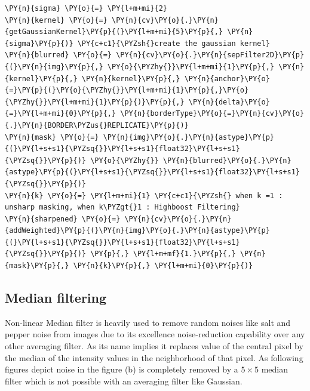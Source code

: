 \documentclass[a4paper,10pt]{article}%
\begin{document}
    \begin{tcolorbox}[breakable, size=fbox, boxrule=1pt, pad at break*=1mm,colback=cellbackground, colframe=cellborder]
\begin{Verbatim}[commandchars=\\\{\}]
\PY{n}{sigma} \PY{o}{=} \PY{l+m+mi}{2} 
\PY{n}{kernel} \PY{o}{=} \PY{n}{cv}\PY{o}{.}\PY{n}{getGaussianKernel}\PY{p}{(}\PY{l+m+mi}{5}\PY{p}{,} \PY{n}{sigma}\PY{p}{)} \PY{c+c1}{\PYZsh{}create the gaussian kernel}
\PY{n}{blurred} \PY{o}{=} \PY{n}{cv}\PY{o}{.}\PY{n}{sepFilter2D}\PY{p}{(}\PY{n}{img}\PY{p}{,} \PY{o}{\PYZhy{}}\PY{l+m+mi}{1}\PY{p}{,} \PY{n}{kernel}\PY{p}{,} \PY{n}{kernel}\PY{p}{,} \PY{n}{anchor}\PY{o}{=}\PY{p}{(}\PY{o}{\PYZhy{}}\PY{l+m+mi}{1}\PY{p}{,}\PY{o}{\PYZhy{}}\PY{l+m+mi}{1}\PY{p}{)}\PY{p}{,} \PY{n}{delta}\PY{o}{=}\PY{l+m+mi}{0}\PY{p}{,} \PY{n}{borderType}\PY{o}{=}\PY{n}{cv}\PY{o}{.}\PY{n}{BORDER\PYZus{}REPLICATE}\PY{p}{)}
\PY{n}{mask} \PY{o}{=} \PY{n}{img}\PY{o}{.}\PY{n}{astype}\PY{p}{(}\PY{l+s+s1}{\PYZsq{}}\PY{l+s+s1}{float32}\PY{l+s+s1}{\PYZsq{}}\PY{p}{)} \PY{o}{\PYZhy{}} \PY{n}{blurred}\PY{o}{.}\PY{n}{astype}\PY{p}{(}\PY{l+s+s1}{\PYZsq{}}\PY{l+s+s1}{float32}\PY{l+s+s1}{\PYZsq{}}\PY{p}{)}
\PY{n}{k} \PY{o}{=} \PY{l+m+mi}{1} \PY{c+c1}{\PYZsh{} when k =1 : unsharp masking, when k\PYZgt{}1 : Highboost Filtering}
\PY{n}{sharpened} \PY{o}{=} \PY{n}{cv}\PY{o}{.}\PY{n}{addWeighted}\PY{p}{(}\PY{n}{img}\PY{o}{.}\PY{n}{astype}\PY{p}{(}\PY{l+s+s1}{\PYZsq{}}\PY{l+s+s1}{float32}\PY{l+s+s1}{\PYZsq{}}\PY{p}{)} \PY{p}{,} \PY{l+m+mf}{1.}\PY{p}{,} \PY{n}{mask}\PY{p}{,} \PY{n}{k}\PY{p}{,} \PY{l+m+mi}{0}\PY{p}{)}
\end{Verbatim}
\end{tcolorbox}

\subsection{Median filtering }
Non-linear Median filter is heavily used to remove random noises like salt and pepper noise from images due to its excellence  noise-reduction capability over any other averaging filter. As its name implies it replaces value of the central pixel by the median of the intensity values in the neighborhood of that pixel. As following figures depict noise in the figure (b) is completely removed by a $5 \times 5$ median filter which is not possible with an averaging filter like Gaussian.
\end{document}
